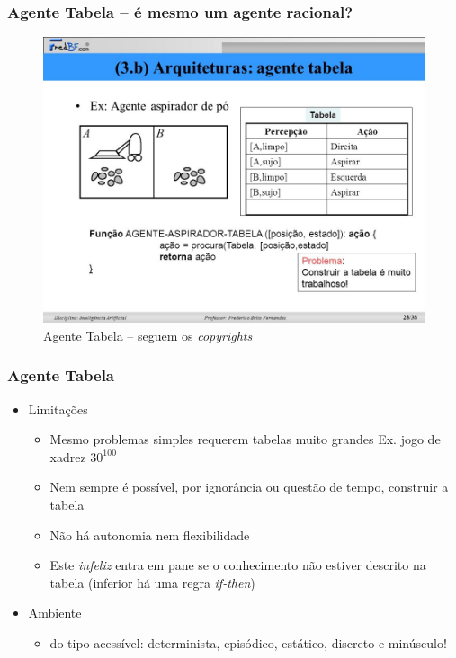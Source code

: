 
\begin{frame} %

    \frametitle{Agente Tabela – é mesmo um agente racional?}

\begin{figure}[!ht]
  \centering
  \includegraphics[height =.6\textheight,width=.7\textwidth]{figuras/agente_tabela.jpg}
  \caption{Agente Tabela -- seguem os \textit{copyrights}}
\end{figure}

\end{frame}




\begin{frame} %

    \frametitle{Agente Tabela}

\begin{itemize}
  \item Limitações
  \begin{itemize}
    \item Mesmo problemas simples requerem tabelas muito grandes 
Ex. jogo de xadrez $30^{100}$
    \item Nem sempre é possível, por ignorância ou questão de tempo, construir a tabela 
    \item  Não há autonomia nem flexibilidade
    
    \item Este \textit{infeliz} entra em pane se o conhecimento  não estiver descrito na tabela (inferior há uma regra \textit{if-then})
    
  \end{itemize}
  
  \item Ambiente
\begin{itemize}
  \item do tipo acessível:  determinista, episódico, 
   estático, discreto e minúsculo!
   
\end{itemize}
  
\end{itemize}
\end{frame}



